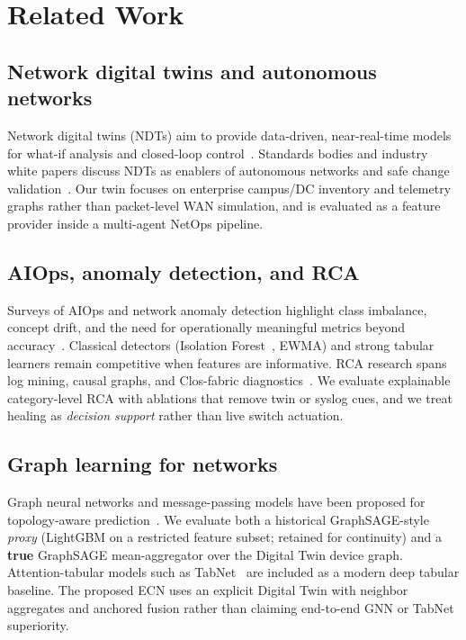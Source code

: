 \section{Related Work}
\label{sec:related}

\subsection{Network digital twins and autonomous networks}
Network digital twins (NDTs) aim to provide data-driven, near-real-time models for what-if analysis and closed-loop control~\cite{almasan2022ndt,itu_y3090}. Standards bodies and industry white papers discuss NDTs as enablers of autonomous networks and safe change validation~\cite{ietfdraftndt,etsi2024autonomous}. Our twin focuses on enterprise campus/DC inventory and telemetry graphs rather than packet-level WAN simulation, and is evaluated as a feature provider inside a multi-agent NetOps pipeline.

\subsection{AIOps, anomaly detection, and RCA}
Surveys of AIOps and network anomaly detection highlight class imbalance, concept drift, and the need for operationally meaningful metrics beyond accuracy~\cite{dang2019aiops,notaro2021survey,chandola2009anomaly}. Classical detectors (Isolation Forest~\cite{liu2008isolation}, EWMA) and strong tabular learners remain competitive when features are informative. RCA research spans log mining, causal graphs, and Clos-fabric diagnostics~\cite{notaro2021survey}. We evaluate explainable category-level RCA with ablations that remove twin or syslog cues, and we treat healing as \emph{decision support} rather than live switch actuation.

\subsection{Graph learning for networks}
Graph neural networks and message-passing models have been proposed for topology-aware prediction~\cite{hamilton2017inductive,rusek2019routenet}. We evaluate both a historical GraphSAGE-style \emph{proxy} (LightGBM on a restricted feature subset; retained for continuity) and a \textbf{true} GraphSAGE mean-aggregator over the Digital Twin device graph. Attention-tabular models such as TabNet~\cite{arik2021tabnet} are included as a modern deep tabular baseline. The proposed ECN uses an explicit Digital Twin with neighbor aggregates and anchored fusion rather than claiming end-to-end GNN or TabNet superiority.

